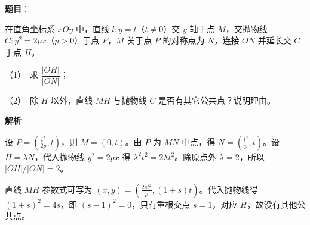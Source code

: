 \begin{answer}

\textbf{题目}：

在直角坐标系 \(xOy\) 中，直线 \(l:y=t\)（\(t\ne 0\)）交 \(y\) 轴于点 \(M\)，交抛物线 \(C:y^2=2px\)（\(p>0\)）于点 \(P\)，\(M\) 关于点 \(P\) 的对称点为 \(N\)，连接 \(ON\) 并延长交 \(C\) 于点 \(H\)。

   （1）　求 \(\dfrac{|OH|}{|ON|}\)；

   （2）　除 \(H\) 以外，直线 \(MH\) 与抛物线 \(C\) 是否有其它公共点？说明理由。

\textbf{解析}


设 \(P=(\frac{t^2}{2p},t)\)，则 \(M=(0,t)\)。由 \(P\) 为 \(MN\) 中点，得 \(N=(\frac{t^2}{p},t)\)。设 \(H=\lambda N\)，代入抛物线 \(y^2=2px\) 得 \(\lambda^2t^2=2\lambda t^2\)。除原点外 \(\lambda=2\)，所以 \(|OH|/|ON|=2\)。


直线 \(MH\) 参数式可写为 \((x,y)=(\frac{2st^2}{p},(1+s)t)\)。代入抛物线得 \((1+s)^2=4s\)，即 \((s-1)^2=0\)，只有重根交点 \(s=1\)，对应 \(H\)，故没有其他公共点。



\end{answer}
